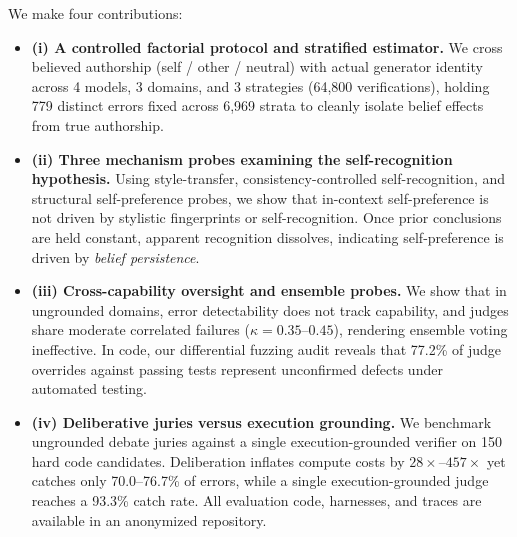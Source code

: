 We make four contributions:
\begin{itemize}[nosep, leftmargin=*]
    \item \textbf{(i) A controlled factorial protocol and stratified estimator.} We cross believed authorship (self / other / neutral) with actual generator identity across 4 models, 3 domains, and 3 strategies (64,800 verifications), holding 779 distinct errors fixed across 6,969 strata to cleanly isolate belief effects from true authorship.
    \item \textbf{(ii) Three mechanism probes examining the self-recognition hypothesis.} Using style-transfer, consistency-controlled self-recognition, and structural self-preference probes, we show that in-context self-preference is not driven by stylistic fingerprints or self-recognition. Once prior conclusions are held constant, apparent recognition dissolves, indicating self-preference is driven by \emph{belief persistence}.
    \item \textbf{(iii) Cross-capability oversight and ensemble probes.} We show that in ungrounded domains, error detectability does not track capability, and judges share moderate correlated failures ($\kappa = 0.35\text{--}0.45$), rendering ensemble voting ineffective. In code, our differential fuzzing audit reveals that 77.2\% of judge overrides against passing tests represent unconfirmed defects under automated testing.
    \item \textbf{(iv) Deliberative juries versus execution grounding.} We benchmark ungrounded debate juries against a single execution-grounded verifier on 150 hard code candidates. Deliberation inflates compute costs by $28\times\text{--}457\times$ yet catches only 70.0--76.7\% of errors, while a single execution-grounded judge reaches a 93.3\% catch rate. All evaluation code, harnesses, and traces are available in an anonymized repository.
\end{itemize}


